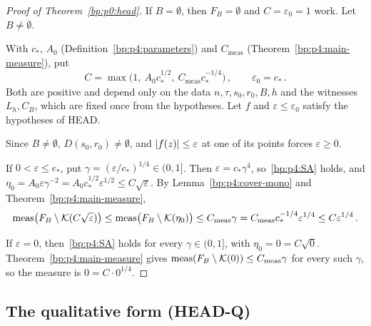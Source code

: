 \begin{proof}[Proof of Theorem~\ref{bp:p0:head}]
\label{step:p4:head-empty}
If $B=\emptyset$, then $F_B=\emptyset$ and $C=\varepsilon_0=1$ work. Let $B\ne\emptyset$.

\label{step:p4:head-constants}
With $c_*$, $A_0$ (Definition~\ref{bp:p4:parameters}) and $C_{\mathrm{meas}}$
(Theorem~\ref{bp:p4:main-measure}), put
\begin{equation*}
C=\max\bigl(1,\ A_0c_*^{1/2},\ C_{\mathrm{meas}}c_*^{-1/4}\bigr)\,,\qquad\varepsilon_0=c_*\,.
\end{equation*}
Both are positive and depend only on the data $n,\tau,s_0,r_0,B,h$ and the witnesses $L_h,C_B$,
which are fixed once from the hypotheses. Let $f$ and $\varepsilon\le\varepsilon_0$ satisfy the
hypotheses of HEAD.

\label{step:p4:head-negative}
Since $B\ne\emptyset$, $D(s_0,r_0)\ne\emptyset$, and $\lvert f(z)\rvert\le\varepsilon$ at one of its points
forces $\varepsilon\ge0$.

\label{step:p4:head-positive}
If $0<\varepsilon\le c_*$, put $\gamma=(\varepsilon/c_*)^{1/4}\in(0,1]$. Then $\varepsilon=c_*\gamma^4$,
so~\eqref{bp:p4:SA} holds, and $\eta_0=A_0\varepsilon\gamma^{-2}=A_0c_*^{1/2}\varepsilon^{1/2}\le C\sqrt\varepsilon$.
By Lemma~\ref{bp:p4:cover-mono} and Theorem~\ref{bp:p4:main-measure},
\begin{equation*}
\operatorname{meas}\bigl(F_B\setminus\mathcal K(C\sqrt\varepsilon)\bigr)\le\operatorname{meas}\bigl(F_B\setminus\mathcal K(\eta_0)\bigr)\le C_{\mathrm{meas}}\gamma=C_{\mathrm{meas}}c_*^{-1/4}\varepsilon^{1/4}\le C\varepsilon^{1/4}\,.
\end{equation*}

\label{step:p4:head-zero}
If $\varepsilon=0$, then~\eqref{bp:p4:SA} holds for every $\gamma\in(0,1]$, with $\eta_0=0=C\sqrt0$.
Theorem~\ref{bp:p4:main-measure} gives $\operatorname{meas}(F_B\setminus\mathcal K(0))\le C_{\mathrm{meas}}\gamma$
for every such $\gamma$, so the measure is $0=C\cdot0^{1/4}$.
\end{proof}

\subsection{The qualitative form (HEAD-Q)}\label{bp:p4:sec-headq}

